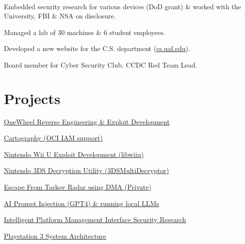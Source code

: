 \documentclass[]{hieudo-build}
\begin{document}
\begin{minipage}[t]{0.65\textwidth}
		 \\
		\begin{tightemize}
			\item Embedded security research for various devices (DoD grant) \& worked with the University, FBI \& NSA on disclosure.
			\item Managed a lab of 30 machines \& 6 student employees.
			\item Developed a new website for the C.S. department (\href{https://www.cs.uaf.edu/}{cs.uaf.edu}).
			\item Board member for Cyber Security Club. CCDC Red Team Lead.
		\end{tightemize}
		
		\section{Projects}
		\vspace{\topsep} %
		\begin{tightemize}
			\item {\href{https://github.com/Relys/rewheel}{\underline{OneWheel Reverse Engineering \& Exploit Development}}}
			\item {\href{https://github.com/lyft/cartography}{\underline{Cartography (OCI IAM support)}}}
			\item {\href{https://github.com/wiiudev/libwiiu}{\underline{Nintendo Wii U Exploit Development (libwiiu)}}}
			\item {\href{https://github.com/Relys/3DS_Multi_Decryptor}{\underline{Nintendo 3DS Decryption Utility (3DS\textunderscore Multi\textunderscore Decryptor)}}}
			\item
			{\underline{Escape From Tarkov Radar using DMA (Private)}}
			\item
			{\underline{AI Prompt Injection (GPT4) \& running local LLMs}}
			\item {\href{https://scholarworks.alaska.edu/handle/11122/9761}{\underline{Intelligent Platform Management Interface Security Research}}}
			\item {\href{https://www.semanticscholar.org/paper/PlayStation-3-System-Architecture-Clayton/9f1819c0ab2370332e2ffcc3a5d1042301f3279ce}{\underline{Playstation 3 System Architecture}}}
		\end{tightemize}
		\sectionsep
	\end{minipage} 
	
\end{document}
